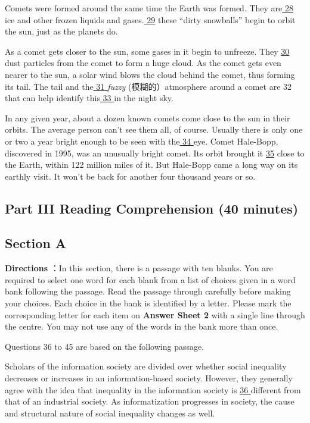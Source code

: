 \documentclass[UTF8,11pt]{ctexart}
\begin{document}
Comets were formed around the same time the Earth was formed. They are\uline{ 28 }ice and other frozen liquids and gases.\uline{ 29} these “dirty snowballs” begin to orbit the sun, just as the planets do.


As a comet gets closer to the sun, some gases in it begin to unfreeze. They \uline{30} dust particles from the comet to form a huge cloud. As the comet gets even nearer to the sun, a solar wind blows the cloud behind the comet, thus forming its tail. The tail and the\uline{ 31}\textit{\uline{ }}\textit{fuzzy} (模糊的）atmosphere around a comet are 32 that can help identify this\uline{ 33 }in the night sky.


In any given year, about a dozen known comets come close to the sun in their orbits. The average person can’t see them all, of course. Usually there is only one or two a year bright enough to be seen with the\uline{ 34 }eye. Comet Hale-Bopp, discovered in 1995, was an unusually bright comet. Its orbit brought it \uline{35} close to the Earth, within 122 million miles of it. But Hale-Bopp came a long way on its earthly visit. It won’t be back for another four thousand years or so.


\subsection*{\textbf{Part} III \textbf{Reading Comprehension} \textbf{(40 minutes)}}


\subsection*{\textbf{Section A}}


\textbf{Directions} ：In this section, there is a passage with ten blanks. You are required to select one word for each blank from a list of choices given in a word bank following the passage. Read the passage through carefully before making your choices. Each choice in the bank is identified by a letter. Please mark the corresponding letter for each item on \textbf{Answer Sheet 2} with a single line through the centre. You may not use any of the words in the bank more than once.


Questions 36 to 45 are based on the following passage.


Scholars of the information society are divided over whether social inequality decreases or increases in an information-based society. However, they generally agree with the idea that inequality in the information society is \uline{36 }different from that of an industrial society. As informatization progresses in society, the cause and structural nature of social inequality changes as well.
\end{document}
